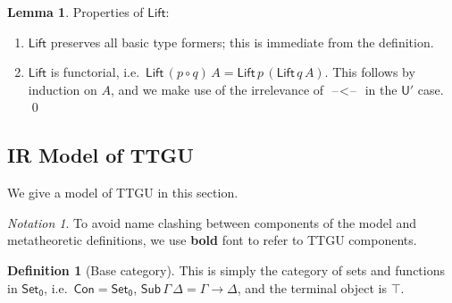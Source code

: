 \documentclass[a4paper,UKenglish,cleveref, autoref, thm-restate]{lipics-v2021}
\theoremstyle{remark}
\newtheorem{notation}{Notation}
\theoremstyle{definition}
\newtheorem{mydefinition}{Definition}
\newtheorem{mylemma}{Lemma}
\newcommand{\Set}[1]{\mathsf{Set_{#1}}}
\newcommand{\Con}{\mathsf{Con}}
\newcommand{\Sub}{\mathsf{Sub}}
\newcommand{\U}{\mathsf{U}}
\newcommand{\blank}{\mathord{\hspace{1pt}\text{--}\hspace{1pt}}}
\newcommand{\Lift}{\mathsf{Lift}}
\renewcommand{\U}{\mathsf{U}}
\begin{document}
\begin{mylemma}\label{lem:liftprop} Properties of $\Lift$:
\begin{enumerate}
  \item $\Lift$ preserves all basic type formers; this is immediate from the definition.
  \item $\Lift$ is functorial, i.e.\ $\Lift\,(p \circ q)\,A = \Lift\,p\,(\Lift\,q\,A)$. This follows
    by induction on $A$, and we make use of the irrelevance of $\blank\!<\!\blank$ in the $\U'$ case.
    \qed
\end{enumerate}
\end{mylemma}

\subsection{IR Model of TTGU}

We give a model of TTGU in this section.

\begin{notation} To avoid name clashing between components of the model and metatheoretic
definitions, we use \textbf{bold} font to refer to TTGU components.
\end{notation}

\begin{mydefinition}[Base category]
This is simply the category of sets and functions in $\Set0$, i.e.\ $\bm{\Con} = \Set0$,
$\bm{\Sub}\,\Gamma\,\Delta = \Gamma \to \Delta$, and the terminal object is $\top$.
\end{mydefinition}
\end{document}
